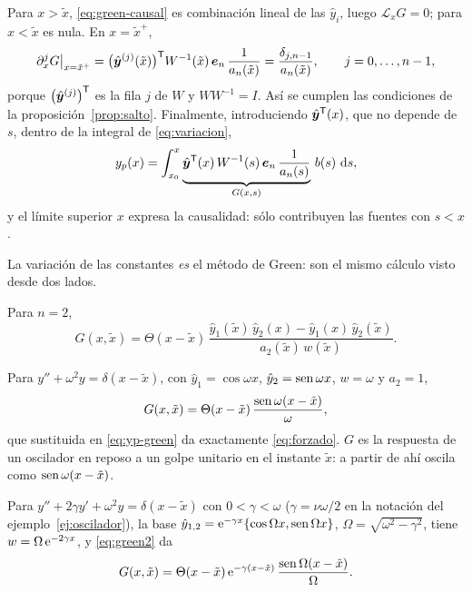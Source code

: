 \documentclass[11pt,twoside]{article}
\newcommand\Lop{\mathcal L}
\newcommand\yh{\hat y}
\newcommand\vyh{\hat{\bm y}}
\newcommand\ve{\bm e}
\newcommand\xt{\tilde x}
\begin{document}
\begin{demostracion}
Para $x>\xt$, \eqref{eq:green-causal} es combinación lineal de las $\yh_i$, luego $\Lop_xG=0$; para $x<\xt$ es nula. En
$x=\xt^+$,
\begin{equation*}
\partial_x^jG\big|_{x=\xt^+}=\big(\vyh^{(j)}(\xt)\big)\T W^{-1}(\xt)\,\ve_n\,\frac{1}{a_n(\xt)}=\frac{\delta_{j,n-1}}{a_n(\xt)},
\qquad j=0,\dots,n-1,
\end{equation*}
porque $\big(\vyh^{(j)}\big)\T$ es la fila $j$ de $W$ y $WW^{-1}=I$. Así se cumplen las condiciones de la
proposición~\ref{prop:salto}. Finalmente, introduciendo $\vyh\T(x)$, que no depende de $s$, dentro de la integral de
\eqref{eq:variacion},
\begin{equation}\label{eq:mismo}
y_p(x)=\int_{x_0}^{x}\underbrace{\vyh\T(x)\,W^{-1}(s)\,\ve_n\,\frac{1}{a_n(s)}}_{G(x,s)}\,b(s)\,\dd s,
\end{equation}
y el límite superior $x$ expresa la causalidad: sólo contribuyen las fuentes con $s<x$.
\end{demostracion}

La variación de las constantes \emph{es} el método de Green: son el mismo cálculo visto desde dos lados.

\begin{corolario}[Orden 2]\label{cor:orden2}
Para $n=2$,
\begin{equation}\label{eq:green2}
G(x,\xt)=\Theta(x-\xt)\,\frac{\yh_1(\xt)\,\yh_2(x)-\yh_1(x)\,\yh_2(\xt)}{a_2(\xt)\,w(\xt)}.
\end{equation}
\end{corolario}

\begin{ejemplo}[Oscilador]\label{ej:greenosc}
Para $y''+\omega^2y=\delta(x-\xt)$, con $\yh_1=\cos\omega x$, $\yh_2=\sen\omega x$, $w=\omega$ y $a_2=1$,
\begin{equation}\label{eq:greenosc}
G(x,\xt)=\Theta(x-\xt)\,\frac{\sen\omega(x-\xt)}{\omega},
\end{equation}
que sustituida en \eqref{eq:yp-green} da exactamente \eqref{eq:forzado}. $G$ es la respuesta de un oscilador en reposo a
un golpe unitario en el instante $\xt$: a partir de ahí oscila como $\sen\omega(x-\xt)$.
\end{ejemplo}

\begin{ejemplo}\label{ej:greenamort}
Para $y''+2\gamma y'+\omega^2y=\delta(x-\xt)$ con $0<\gamma<\omega$ ($\gamma=\nu\omega/2$ en la notación del
ejemplo~\ref{ej:oscilador}), la base $\yh_{1,2}=\e^{-\gamma x}\{\cos\Omega x,\sen\Omega x\}$, $\Omega=\sqrt{\omega^2-\gamma^2}$,
tiene $w=\Omega\,\mathrm{e}^{-2\gamma x}$, y \eqref{eq:green2} da
\begin{equation}\label{eq:greenamort}
G(x,\xt)=\Theta(x-\xt)\,\e^{-\gamma(x-\xt)}\,\frac{\sen\Omega(x-\xt)}{\Omega}.
\end{equation}
\end{ejemplo}
\end{document}
